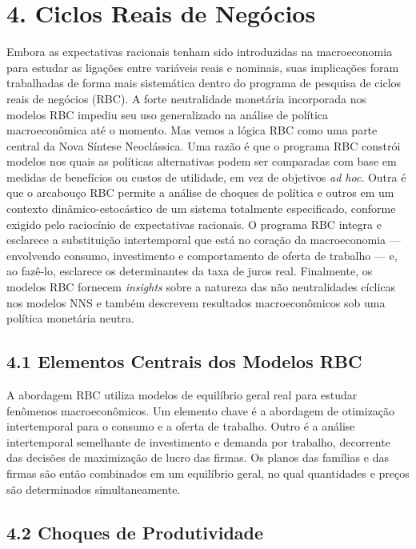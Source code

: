\documentclass[12pt]{article}
\begin{document}
\section{4. Ciclos Reais de Negócios}

Embora as expectativas racionais tenham sido introduzidas na macroeconomia para estudar as ligações entre variáveis reais e nominais, suas implicações foram trabalhadas de forma mais sistemática dentro do programa de pesquisa de ciclos reais de negócios (RBC). A forte neutralidade monetária incorporada nos modelos RBC impediu seu uso generalizado na análise de política macroeconômica até o momento. Mas vemos a lógica RBC como uma parte central da Nova Síntese Neoclássica. Uma razão é que o programa RBC constrói modelos nos quais as políticas alternativas podem ser comparadas com base em medidas de benefícios ou custos de utilidade, em vez de objetivos \textit{ad hoc}. Outra é que o arcabouço RBC permite a análise de choques de política e outros em um contexto dinâmico-estocástico de um sistema totalmente especificado, conforme exigido pelo raciocínio de expectativas racionais. O programa RBC integra e esclarece a substituição intertemporal que está no coração da macroeconomia — envolvendo consumo, investimento e comportamento de oferta de trabalho — e, ao fazê-lo, esclarece os determinantes da taxa de juros real. Finalmente, os modelos RBC fornecem \textit{insights} sobre a natureza das não neutralidades cíclicas nos modelos NNS e também descrevem resultados macroeconômicos sob uma política monetária neutra.

\subsection{4.1 Elementos Centrais dos Modelos RBC}

A abordagem RBC utiliza modelos de equilíbrio geral real para estudar fenômenos macroeconômicos. Um elemento chave é a abordagem de otimização intertemporal para o consumo e a oferta de trabalho. Outro é a análise intertemporal semelhante de investimento e demanda por trabalho, decorrente das decisões de maximização de lucro das firmas. Os planos das famílias e das firmas são então combinados em um equilíbrio geral, no qual quantidades e preços são determinados simultaneamente.

\subsection{4.2 Choques de Produtividade}
\end{document}
